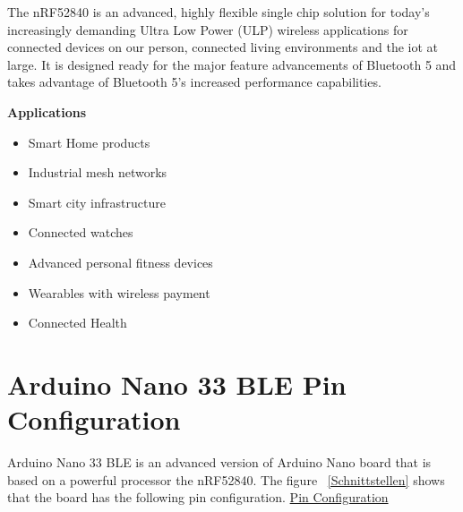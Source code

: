 The nRF52840 is an advanced, highly flexible single chip solution for today’s increasingly demanding Ultra Low Power (ULP) wireless applications for connected devices on our person, connected living environments and the \ac{iot} at large. It is designed ready for the major feature
advancements of Bluetooth 5 and takes advantage of Bluetooth 5's increased performance capabilities. \cite{Arduino:2021b}

\textbf{Applications}

\begin{itemize}
    \item Smart Home products
    \item Industrial mesh networks
    \item Smart city infrastructure
    \item Connected watches
    \item Advanced personal fitness devices
    \item Wearables with wireless payment
    \item Connected Health
\end{itemize}


\section{Arduino Nano 33 BLE Pin Configuration}

Arduino Nano 33 BLE is an advanced version of Arduino Nano board that is based on a powerful processor the nRF52840. The figure ~\ref{Schnittstellen} shows that the board has the following pin configuration. \href{https://www.etechnophiles.com/arduino-nano-33-ble-sense-pinout-introduction-specifications/}{Pin Configuration}


